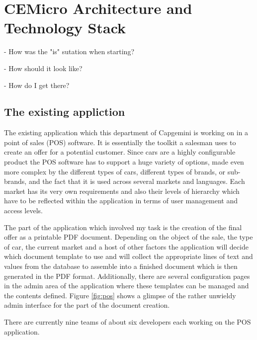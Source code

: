 \chapter{CEMicro Architecture and Technology Stack}
\label{sec:arch}

- How was the "is" sutation when starting?

- How should it look like?

- How do I get there?


\section{The existing appliction}

The existing application which this department of Capgemini is working on in a point of sales (POS) software. It is essentially the toolkit a salesman uses to create an offer for a potential customer. Since cars are a highly configurable product the POS software has to support a huge variety of options, made even more complex by the different types of cars, different types of brands, or sub-brands, and the fact that it is used across several markets and languages. Each market has its very own requirements and also their levels of hierarchy which have to be reflected within the application in terms of user management and access levels.

The part of the application which involved my task is the creation of the final offer as a printable PDF document. Depending on the object of the sale, the type of car, the current market and a host of other factors the application will decide which document template to use and will collect the appropriate lines of text and values from the database to assemble into a finished document which is then generated in the PDF format. Additionally, there are several configuration pages in the admin area of the application where these templates can be managed and the contents defined. Figure \ref{fig:pos} shows a glimpse of the rather unwieldy admin interface for the part of the document creation.

There are currently nine teams of about six developers each working on the POS application.

